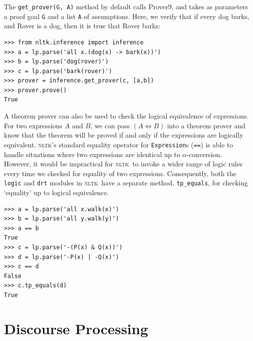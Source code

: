 \documentclass[11pt, a4paper]{article}
\newcommand{\NLTK}{\textsc{nltk}}
\begin{document}
The \verb!get_prover(G, A)! method by default calls Prover9, and takes as
parameters a proof goal \texttt{G} and a list \texttt{A} of assumptions.
Here, we verify that if every dog barks, and Rover is a dog,
then it is true that Rover barks:
\begin{Verbatim}
>>> from nltk.inference import inference
>>> a = lp.parse('all x.(dog(x) -> bark(x))')
>>> b = lp.parse('dog(rover)')
>>> c = lp.parse('bark(rover)')
>>> prover = inference.get_prover(c, [a,b])
>>> prover.prove()
True
\end{Verbatim}

A theorem prover can also be used to check the logical equivalence of
expressions.  For two expressions $A$ and $B$, we can pass $(A\iff B)$
into a theorem prover and know that the theorem will be proved if and
only if the expressions are logically equivalent.  \NLTK's standard
equality operator for \texttt{Expression}s (\texttt{==}) is able to
handle situations where two expressions are identical up to
$\alpha$-conversion.  However, it would be impractical for \NLTK\ to
invoke a wider range of logic rules every time we checked for equality
of two expressions. Consequently, both the \texttt{logic} and 
\texttt{drt} modules in \NLTK\ 
have a separate method, \texttt{tp\_equals}, for checking `equality'
up to logical equivalence.
\newpage
\begin{Verbatim}
>>> a = lp.parse('all x.walk(x)')
>>> b = lp.parse('all y.walk(y)')
>>> a == b
True
>>> c = lp.parse('-(P(x) & Q(x))')
>>> d = lp.parse('-P(x) | -Q(x)')
>>> c == d
False
>>> c.tp_equals(d)
True
\end{Verbatim}

\section{Discourse Processing}
\end{document}
